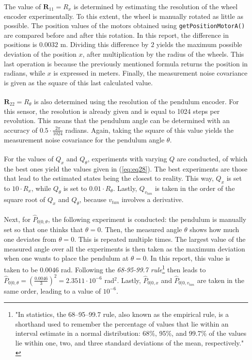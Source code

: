 \documentclass[a4paper,kul]{kulakarticle} %
\begin{document}
\noindent The value of $\mathbf{R}_{11} = R_x$ is determined by estimating the resolution of the wheel encoder experimentally. To this extent, the wheel is manually rotated as little as possible. The position values of the motors obtained using \texttt{getPositionMotorA()} are compared before and after this rotation. In this report, the difference in positions is $0.0032$ m. Dividing this difference by $2$ yields the maximum possible deviation of the position $x$, after multiplication by the radius of the wheels.  This last operation is because the previously mentioned formula returns the position in radians, while $x$ is expressed in meters. Finally, the measurement noise covariance is given as the square of this last calculated value.
\\\\
$\mathbf{R}_{22} = R_\theta$ is also determined using the resolution of the pendulum encoder. For this sensor, the resolution is already given and is equal to 1024 steps per revolution. This means that the pendulum angle can be determined with an accuracy of $0.5\cdot\frac{2\pi}{1024}$ radians. Again, taking the square of this value yields the measurement noise covariance for the pendulum angle $\theta$. 
\\\\
For the values of $Q_x$ and $Q_\theta$, experiments with varying $Q$ are conducted, of which the best ones yield the values given in (\ref{eq:eq28}). The best experiments are those that lead to the estimated states being the closest to reality. This way, $Q_x$ is set to $10\cdot R_x$, while $Q_\theta$ is set to $0.01 \cdot R_\theta$. Lastly, $Q_{v_{tan}}$ is taken in the order of the square root of $Q_x$ and $Q_\theta$, because $v_{tan}$ involves a derivative.
\\\\
Next, for $\hat{P}_{0|0, \theta}$, the following experiment is conducted: the pendulum is manually set so that one thinks that $\theta = 0$. Then, the measured angle $\theta$ shows how much one deviates from $\theta = 0$. This is repeated multiple times. The largest value of the measured angle over all the experiments is then taken as the maximum deviation when one wants to place the pendulum at $\theta = 0$. In this report, this value is taken to be $0.0046$ rad. Following the \textit{68-95-99.7 rule}\footnote{"In statistics, the 68–95–99.7 rule, also known as the empirical rule, is a shorthand used to remember the percentage of values that lie within an interval estimate in a normal distribution: 68\%, 95\%, and 99.7\% of the values lie within one, two, and three standard deviations of the mean, respectively." \cite{68rule}} then leads to $\hat{P}_{0|0, \theta} = \left(\frac{0.0046}{3}\right)^2 = 2.3511\cdot 10^{-6}$ rad$^2$. Lastly, $\hat{P}_{0|0, x}$ and $\hat{P}_{0|0, v_{tan}}$ are taken in the same order, leading to a value of $10^{-6}$.
\end{document}
